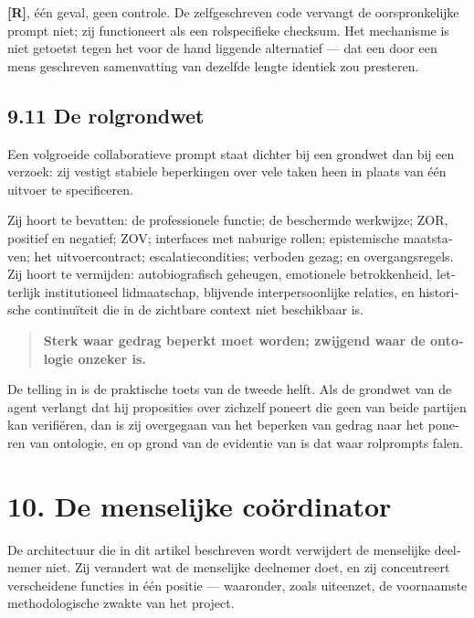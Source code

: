 \begin{dutch}
\textbf{[R]}, één geval, geen controle. De zelfgeschreven code vervangt de oorspronkelijke prompt niet; zij functioneert als een rolspecifieke checksum. Het mechanisme is niet getoetst tegen het voor de hand liggende alternatief — dat een door een mens geschreven samenvatting van dezelfde lengte identiek zou presteren.


\subsection*{9.11 De rolgrondwet}
\label{sec:nl:9.11}

Een volgroeide collaboratieve prompt staat dichter bij een grondwet dan bij een verzoek: zij vestigt stabiele beperkingen over vele taken heen in plaats van één uitvoer te specificeren.

Zij hoort te bevatten: de professionele functie; de beschermde werkwijze; ZOR, positief en negatief; ZOV; interfaces met naburige rollen; epistemische maatstaven; het uitvoercontract; escalatiecondities; verboden gezag; en overgangsregels. Zij hoort te vermijden: autobiografisch geheugen, emotionele betrokkenheid, letterlijk institutioneel lidmaatschap, blijvende interpersoonlijke relaties, en historische continuïteit die in de zichtbare context niet beschikbaar is.

\begin{quote}
\textbf{Sterk waar gedrag beperkt moet worden; zwijgend waar de ontologie onzeker is.}
\end{quote}
De telling in  is de praktische toets van de tweede helft. Als de grondwet van de agent verlangt dat hij proposities over zichzelf poneert die geen van beide partijen kan verifiëren, dan is zij overgegaan van het beperken van gedrag naar het poneren van ontologie, en op grond van de evidentie van  is dat waar rolprompts falen.


\section*{10. De menselijke coördinator}
\label{sec:nl:10}

De architectuur die in dit artikel beschreven wordt verwijdert de menselijke deelnemer niet. Zij verandert wat de menselijke deelnemer doet, en zij concentreert verscheidene functies in één positie — waaronder, zoals  uiteenzet, de voornaamste methodologische zwakte van het project.



\end{dutch}
